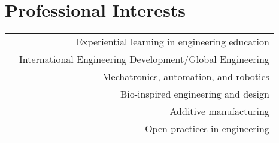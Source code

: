 \section*{Professional Interests}
\begin{tabular}{L!{\VRule}R}
&Experiential learning in engineering education\\
&International Engineering Development/Global Engineering\\
&Mechatronics, automation, and robotics\\
&Bio-inspired engineering and design\\
&Additive manufacturing\\
&Open practices in engineering\\
\end{tabular}